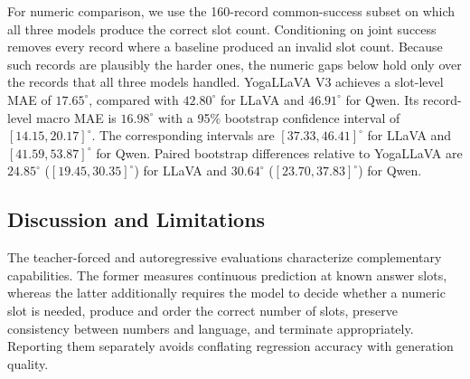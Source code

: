 \documentclass[conference]{IEEEtran}
\begin{document}
For numeric comparison, we use the 160-record common-success subset on which all three models produce the correct slot count.
Conditioning on joint success removes every record where a baseline produced an invalid slot count.
Because such records are plausibly the harder ones, the numeric gaps below hold only over the records that all three models handled.
YogaLLaVA V3 achieves a slot-level MAE of $17.65^\circ$, compared with $42.80^\circ$ for LLaVA and $46.91^\circ$ for Qwen.
Its record-level macro MAE is $16.98^\circ$ with a 95\% bootstrap confidence interval of $[14.15,20.17]^\circ$.
The corresponding intervals are $[37.33,46.41]^\circ$ for LLaVA and $[41.59,53.87]^\circ$ for Qwen.
Paired bootstrap differences relative to YogaLLaVA are $24.85^\circ$ ($[19.45,30.35]^\circ$) for LLaVA and $30.64^\circ$ ($[23.70,37.83]^\circ$) for Qwen.

\begin{table}[t]
    \centering
    \caption{Autoregressive generation on 310 test records. Slot accuracy is
    measured on the full test set and reported with Wilson 95\% confidence
    intervals. Numeric errors use the 160-record common-success subset.}
    \label{tab:generation_results}
\end{table}

\subsection{Discussion and Limitations}
\label{sec:result_interpretation}

The teacher-forced and autoregressive evaluations characterize complementary capabilities.
The former measures continuous prediction at known answer slots, whereas the latter additionally requires the model to decide whether a numeric slot is needed, produce and order the correct number of slots, preserve consistency between numbers and language, and terminate appropriately.
Reporting them separately avoids conflating regression accuracy with generation quality.
\end{document}
